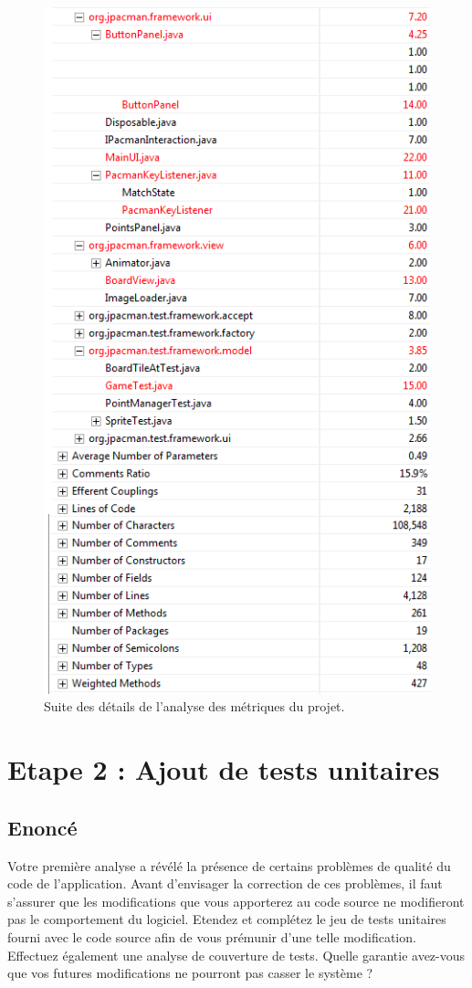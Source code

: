 \documentclass[12pt,a4paper,final]{article}
\begin{document}
\begin{figure}[!h]
	\centering
	\includegraphics[height=\textheight]{Metrique_.png}
	\caption{\label{métrique0}Suite des détails de l'analyse des métriques du projet.}
\end{figure}

\newpage
\section{Etape 2 : Ajout de tests unitaires}\label{sec:etape2}
\subsection{Enoncé}
Votre première analyse a révélé la présence de certains problèmes de qualité du code de l'application.
Avant d'envisager la correction de ces problèmes, il faut s'assurer que les modifications que vous apporterez au code source ne modifieront pas le comportement du logiciel.
Etendez et complétez le jeu de tests unitaires fourni avec le code source afin de vous prémunir d'une telle modification. Effectuez également une analyse de couverture de tests.
Quelle garantie avez-vous que vos futures modifications ne pourront pas casser le système ?
\end{document}

